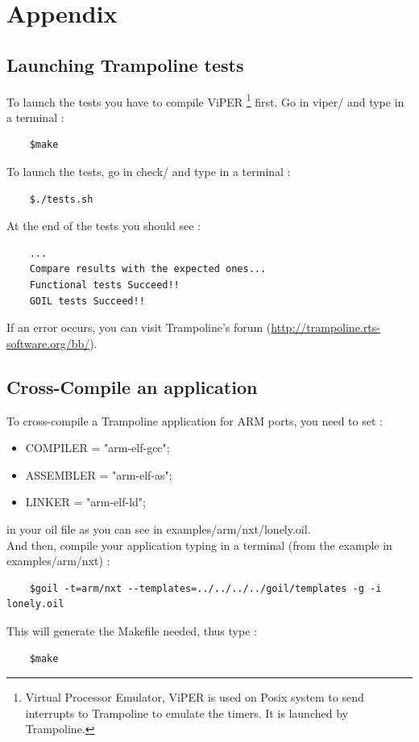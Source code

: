\newpage
\chapter{Appendix}
\section{Launching Trampoline tests} \label{tests}
To launch the tests you have to compile ViPER \footnote{Virtual Processor Emulator, ViPER is used on Posix system to send interrupts to Trampoline to emulate the timers. It is launched by Trampoline.} first. Go in viper/ and type in a terminal :
	\begin{verbatim}
	$make
	\end{verbatim}
To launch the tests, go in check/ and type in a terminal :
	\begin{verbatim}
	$./tests.sh
	\end{verbatim}
At the end of the tests you should see :
	\begin{verbatim}
	...
	Compare results with the expected ones...
	Functional tests Succeed!!
	GOIL tests Succeed!!
	\end{verbatim}
If an error occurs, you can visit Trampoline's forum (\href{http://trampoline.rts-software.org/bb/}{http://trampoline.rts-software.org/bb/}).


\section{Cross-Compile an application} \label{compileanapplication}
To cross-compile a Trampoline application for ARM ports, you need to set  :
\begin{itemize}
\item COMPILER = "arm-elf-gcc";
\item ASSEMBLER = "arm-elf-as";
\item LINKER = "arm-elf-ld";
\end{itemize}
in your oil file as you can see in examples/arm/nxt/lonely.oil.\\
And then, compile your application typing in a terminal (from the example in examples/arm/nxt) :
	\begin{verbatim}
	$goil -t=arm/nxt --templates=../../../../goil/templates -g -i lonely.oil
	\end{verbatim}
This will generate the Makefile needed, thus type :
	\begin{verbatim}
	$make
	\end{verbatim}



